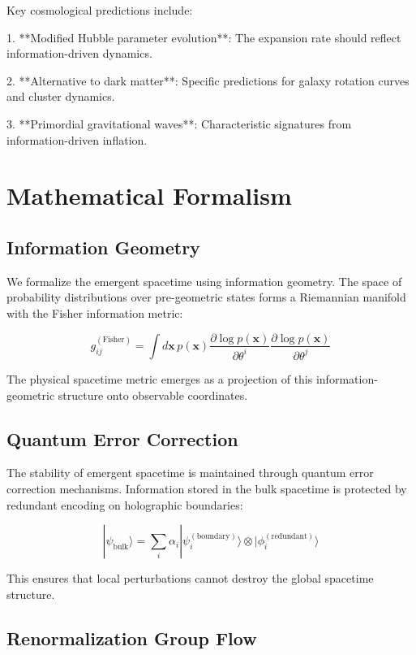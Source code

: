 \documentclass[11pt,a4paper]{article}
\begin{document}
Key cosmological predictions include:

1. **Modified Hubble parameter evolution**: The expansion rate should reflect information-driven dynamics.

2. **Alternative to dark matter**: Specific predictions for galaxy rotation curves and cluster dynamics.

3. **Primordial gravitational waves**: Characteristic signatures from information-driven inflation.

\section{Mathematical Formalism}

\subsection{Information Geometry}

We formalize the emergent spacetime using information geometry. The space of probability distributions over pre-geometric states forms a Riemannian manifold with the Fisher information metric:

\begin{equation}
g_{ij}^{(\text{Fisher})} = \int d\mathbf{x} \, p(\mathbf{x}) \frac{\partial \log p(\mathbf{x})}{\partial \theta^i} \frac{\partial \log p(\mathbf{x})}{\partial \theta^j}
\end{equation}

The physical spacetime metric emerges as a projection of this information-geometric structure onto observable coordinates.

\subsection{Quantum Error Correction}

The stability of emergent spacetime is maintained through quantum error correction mechanisms. Information stored in the bulk spacetime is protected by redundant encoding on holographic boundaries:

\begin{equation}
|\psi_{\text{bulk}}\rangle = \sum_i \alpha_i |\psi_i^{(\text{boundary})}\rangle \otimes |\phi_i^{(\text{redundant})}\rangle
\end{equation}

This ensures that local perturbations cannot destroy the global spacetime structure.

\subsection{Renormalization Group Flow}
\end{document}
